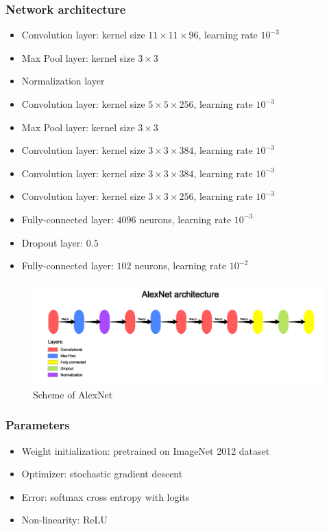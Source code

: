 \documentclass[licencjacka]{pracamgr}
\begin{document}
 		\subsubsection{Network architecture}
 			\begin{itemize}
 			\item Convolution layer: kernel size $11 \times 11 \times 96$, learning rate $10^{-3}$
 			\item Max Pool layer: kernel size $3 \times 3$
 			\item Normalization layer
 			\item Convolution layer: kernel size $5 \times 5 \times 256$, learning rate $10^{-3}$
 			\item Max Pool layer: kernel size $3 \times 3$
 			\item Convolution layer: kernel size $3 \times 3 \times 384$, learning rate $10^{-3}$
 			\item Convolution layer: kernel size $3 \times 3 \times 384$, learning rate $10^{-3}$
 			\item Convolution layer: kernel size $3 \times 3 \times 256$, learning rate $10^{-3}$
 			\item Fully-connected layer: $4096$ neurons, learning rate $10^{-3}$
 			\item Dropout layer: $0.5$
 			\item Fully-connected layer: $102$ neurons, learning rate $10^{-2}$
 			\end{itemize}
 			\begin{figure}[h]
				\caption{Scheme of AlexNet}
				\centering
				\includegraphics[width=\textwidth]{AlexNet}
			\end{figure}
 		\subsubsection{Parameters}
 			\begin{itemize}
 			\item Weight initialization: pretrained on ImageNet 2012 dataset
 			\item Optimizer: stochastic gradient descent
 			\item Error: softmax cross entropy with logits
 			\item Non-linearity: ReLU
			\end{itemize}
\end{document}
